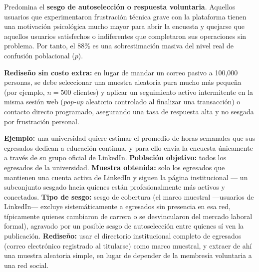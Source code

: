 \begin{solproblema}
	Predomina el \textbf{sesgo de autoselección o respuesta voluntaria}. Aquellos usuarios que experimentaron frustración técnica grave con la plataforma tienen una motivación psicológica mucho mayor para abrir la encuesta y quejarse que aquellos usuarios satisfechos o indiferentes que completaron sus operaciones sin problema. Por tanto, el $88\%$ es una sobrestimación masiva del nivel real de confusión poblacional ($p$).

	\textbf{Rediseño sin costo extra:} en lugar de mandar un correo pasivo a 100,000 personas, se debe seleccionar una muestra aleatoria pura mucho más pequeña (por ejemplo, $n = 500$ clientes) y aplicar un seguimiento activo intermitente en la misma sesión web (\emph{pop-up} aleatorio controlado al finalizar una transacción) o contacto directo programado, asegurando una tasa de respuesta alta y no sesgada por frustración personal.
\end{solproblema}

\begin{solproblema}[prob:701b535]
	\textbf{Ejemplo:} una universidad quiere estimar el promedio de horas semanales que sus egresados dedican a educación continua, y para ello envía la encuesta únicamente a través de su grupo oficial de LinkedIn. \textbf{Población objetivo:} todos los egresados de la universidad. \textbf{Muestra obtenida:} solo los egresados que mantienen una cuenta activa de LinkedIn y siguen la página institucional — un subconjunto sesgado hacia quienes están profesionalmente más activos y conectados. \textbf{Tipo de sesgo:} sesgo de cobertura (el marco muestral —usuarios de LinkedIn— excluye sistemáticamente a egresados sin presencia en esa red, típicamente quienes cambiaron de carrera o se desvincularon del mercado laboral formal), agravado por un posible sesgo de autoselección entre quienes sí ven la publicación. \textbf{Rediseño:} usar el directorio institucional completo de egresados (correo electrónico registrado al titularse) como marco muestral, y extraer de ahí una muestra aleatoria simple, en lugar de depender de la membresía voluntaria a una red social.
\end{solproblema}
